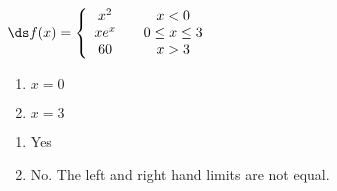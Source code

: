 {$\ds f(x) = \left\{\begin{array}{ccc}
x^2		& &  x<0\\
xe^x	& &  0\leq x\leq 3\\
60 & & x> 3
\end{array}\right.
$
\begin{enumerate}
\item		$x=0$
\item		$x=3$
\end{enumerate}
}
{\begin{enumerate}
\item		Yes
\item		No. The left and right hand limits are not equal.
\end{enumerate}
}
